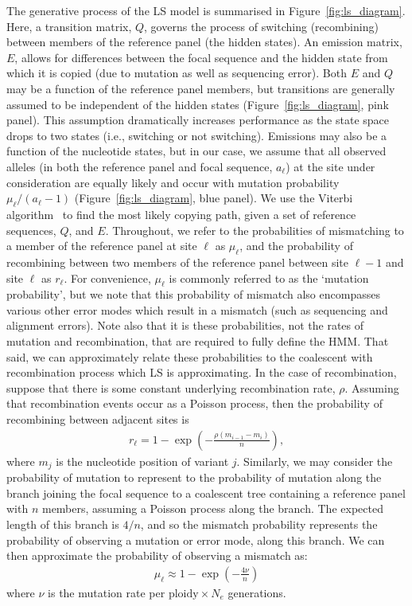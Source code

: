 \documentclass{article}
\begin{document}
The generative process of the LS model is summarised in
Figure~\ref{fig:ls_diagram}. Here, a transition matrix, $Q$, governs the
process of switching (recombining) between members of the reference panel (the
hidden states). An emission matrix, $E$, allows for differences between the
focal sequence and the hidden state from which it is copied (due to mutation as
well as sequencing error).
Both $E$ and $Q$ may be a function of the reference panel members,
but transitions are generally assumed to be independent of the
hidden states (Figure~\ref{fig:ls_diagram}, pink panel).
This assumption dramatically increases performance as the state space drops to two states (i.e., switching or not switching).
Emissions may also be a function of the nucleotide states, but in our
case, we assume that all observed alleles (in both the reference panel and
focal sequence, $a_\ell$) at the site under consideration are equally likely and
occur with mutation probability $\mu_\ell/(a_\ell-1)$
 (Figure~\ref{fig:ls_diagram}, blue panel).
We use the Viterbi algorithm~\citep{Viterbi1967-ol}
to find the most likely copying path, given a set of reference sequences, $Q$, and $E$.
Throughout, we refer to the probabilities of mismatching to a
member of the reference panel at site $\ell$ as $\mu_\ell$,
and the probability of recombining between two members of the reference panel between site $\ell-1$ and site $\ell$ as $r_\ell$. For convenience, $\mu_\ell$ is commonly referred to as the `mutation probability', but we note that this probability of
mismatch also encompasses various other error modes which result in a mismatch
(such as sequencing and alignment errors). Note also that it is these probabilities,
not the rates of mutation and recombination, that are required to fully define the HMM.
That said, we can approximately relate these probabilities to the coalescent with recombination process which LS is approximating. In the case of recombination,
suppose that there is some constant underlying recombination rate, $\rho$.
Assuming that recombination events occur as a Poisson process,
then the probability of recombining between adjacent sites is
\begin{align*}
    r_\ell = 1 - \exp\left(-\frac{\rho\left(m_{i-1} - m_{i}\right)}{n}\right),
\end{align*}
where $m_j$ is the nucleotide position of variant $j$.
Similarly, we may consider the probability of mutation to represent to the
probability of mutation along the branch joining the focal sequence to a coalescent
tree containing a reference panel with $n$ members, assuming a Poisson process
along the branch. The expected length of this branch is $4/n$, and so the mismatch
probability represents the probability of observing a mutation or error mode,
along this branch. We can then approximate the probability of observing a mismatch as:
\begin{align*}
    \mu_\ell \approx 1 - \exp{\left(-\frac{4\nu}{n}\right)}
\end{align*}
where $\nu$ is the mutation rate per $\mbox{ploidy} \times N_e$ generations.
\end{document}
